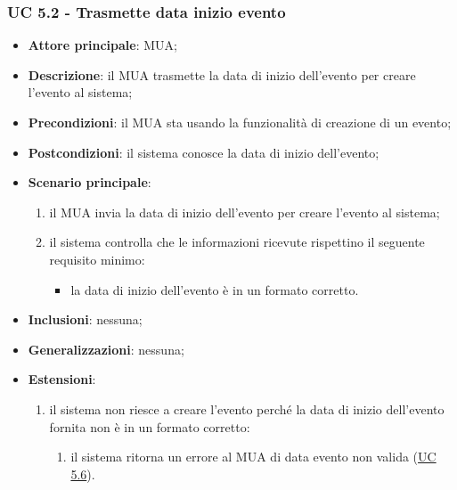     \subsubsection{UC 5.2 - Trasmette data inizio evento} \label{sec:UC5.2}
    \begin{itemize}
        \item \textbf{Attore principale}: MUA;
        \item \textbf{Descrizione}: il MUA trasmette la data di inizio dell'evento per creare l'evento al sistema;
        \item \textbf{Precondizioni}: il MUA sta usando la funzionalità di creazione di un evento;
        \item \textbf{Postcondizioni}: il sistema conosce la data di inizio dell'evento;
        \item \textbf{Scenario principale}:
            \begin{enumerate}
                \item il MUA invia la data di inizio dell'evento per creare l'evento al sistema;
                \item il sistema controlla che le informazioni ricevute rispettino il seguente requisito minimo:
                    \begin{itemize}
                        \item la data di inizio dell'evento è in un formato corretto.
                    \end{itemize}
            \end{enumerate}
        \item \textbf{Inclusioni}: nessuna;
        \item \textbf{Generalizzazioni}: nessuna;
        \item \textbf{Estensioni}:
            \begin{enumerate}[label=\alph*.]
                \item il sistema non riesce a creare l'evento perché la data di inizio dell'evento fornita non è in un formato corretto:
                \begin{enumerate}[label=\arabic*.]
                    \item il sistema ritorna un errore al MUA di data evento non valida (\hyperref[sec:UC5.6]{UC 5.6}).
                \end{enumerate}
            \end{enumerate}
    \end{itemize}


